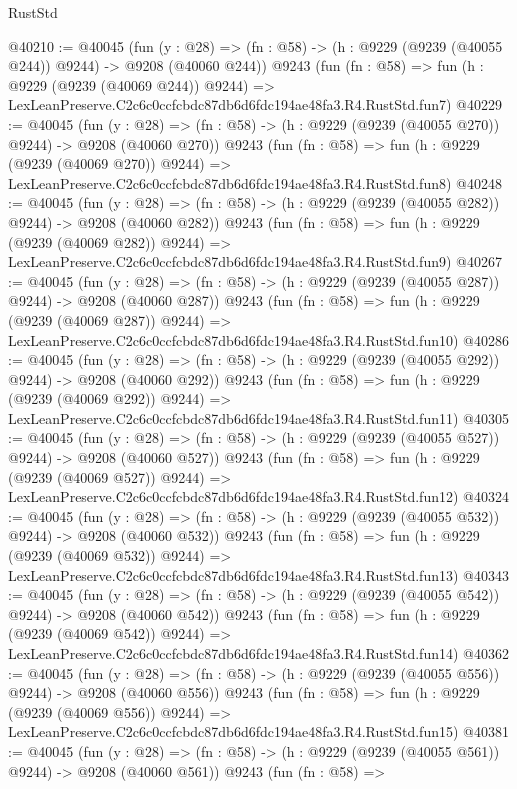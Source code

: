 \begin{lexlean}{RustStd}
\begin{coremodule}
@40210 := @40045
    (fun (y : @28) => (fn : @58) -> (h : @9229 (@9239 (@40055 @244)) @9244) -> @9208 (@40060 @244))
    @9243
    (fun (fn : @58) =>
    fun (h : @9229 (@9239 (@40069 @244)) @9244) =>
    LexLeanPreserve.C2c6c0ccfcbdc87db6d6fdc194ae48fa3.R4.RustStd.fun7)
@40229 := @40045
    (fun (y : @28) => (fn : @58) -> (h : @9229 (@9239 (@40055 @270)) @9244) -> @9208 (@40060 @270))
    @9243
    (fun (fn : @58) =>
    fun (h : @9229 (@9239 (@40069 @270)) @9244) =>
    LexLeanPreserve.C2c6c0ccfcbdc87db6d6fdc194ae48fa3.R4.RustStd.fun8)
@40248 := @40045
    (fun (y : @28) => (fn : @58) -> (h : @9229 (@9239 (@40055 @282)) @9244) -> @9208 (@40060 @282))
    @9243
    (fun (fn : @58) =>
    fun (h : @9229 (@9239 (@40069 @282)) @9244) =>
    LexLeanPreserve.C2c6c0ccfcbdc87db6d6fdc194ae48fa3.R4.RustStd.fun9)
@40267 := @40045
    (fun (y : @28) => (fn : @58) -> (h : @9229 (@9239 (@40055 @287)) @9244) -> @9208 (@40060 @287))
    @9243
    (fun (fn : @58) =>
    fun (h : @9229 (@9239 (@40069 @287)) @9244) =>
    LexLeanPreserve.C2c6c0ccfcbdc87db6d6fdc194ae48fa3.R4.RustStd.fun10)
@40286 := @40045
    (fun (y : @28) => (fn : @58) -> (h : @9229 (@9239 (@40055 @292)) @9244) -> @9208 (@40060 @292))
    @9243
    (fun (fn : @58) =>
    fun (h : @9229 (@9239 (@40069 @292)) @9244) =>
    LexLeanPreserve.C2c6c0ccfcbdc87db6d6fdc194ae48fa3.R4.RustStd.fun11)
@40305 := @40045
    (fun (y : @28) => (fn : @58) -> (h : @9229 (@9239 (@40055 @527)) @9244) -> @9208 (@40060 @527))
    @9243
    (fun (fn : @58) =>
    fun (h : @9229 (@9239 (@40069 @527)) @9244) =>
    LexLeanPreserve.C2c6c0ccfcbdc87db6d6fdc194ae48fa3.R4.RustStd.fun12)
@40324 := @40045
    (fun (y : @28) => (fn : @58) -> (h : @9229 (@9239 (@40055 @532)) @9244) -> @9208 (@40060 @532))
    @9243
    (fun (fn : @58) =>
    fun (h : @9229 (@9239 (@40069 @532)) @9244) =>
    LexLeanPreserve.C2c6c0ccfcbdc87db6d6fdc194ae48fa3.R4.RustStd.fun13)
@40343 := @40045
    (fun (y : @28) => (fn : @58) -> (h : @9229 (@9239 (@40055 @542)) @9244) -> @9208 (@40060 @542))
    @9243
    (fun (fn : @58) =>
    fun (h : @9229 (@9239 (@40069 @542)) @9244) =>
    LexLeanPreserve.C2c6c0ccfcbdc87db6d6fdc194ae48fa3.R4.RustStd.fun14)
@40362 := @40045
    (fun (y : @28) => (fn : @58) -> (h : @9229 (@9239 (@40055 @556)) @9244) -> @9208 (@40060 @556))
    @9243
    (fun (fn : @58) =>
    fun (h : @9229 (@9239 (@40069 @556)) @9244) =>
    LexLeanPreserve.C2c6c0ccfcbdc87db6d6fdc194ae48fa3.R4.RustStd.fun15)
@40381 := @40045
    (fun (y : @28) => (fn : @58) -> (h : @9229 (@9239 (@40055 @561)) @9244) -> @9208 (@40060 @561))
    @9243
    (fun (fn : @58) =>

\end{coremodule}
\end{lexlean}
